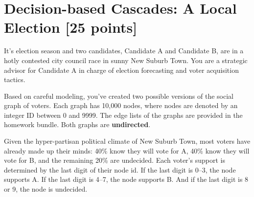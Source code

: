 
\section{Decision-based Cascades: A Local Election [25 points]}
It's election season and two candidates, Candidate A and Candidate B, are in a
hotly contested city council race in sunny New Suburb Town. You are a strategic
advisor for Candidate A in charge of election forecasting and voter acquisition
tactics.

Based on careful modeling, you've created two possible versions of the social
graph of voters. Each graph has 10,000 nodes, where nodes are denoted by an
integer ID between 0 and 9999.  The edge lists of the graphs are provided in 
the homework bundle.
Both graphs are \textbf{undirected}.

Given the hyper-partisan political climate of New Suburb Town, most voters have
already made up their minds: 40\% know they will vote for A, 40\% know they will
vote for B, and the remaining 20\% are undecided. Each voter's support is
determined by the last digit of their node id. If the last digit is 0--3, the
node supports A. If the last digit is 4--7, the node supports B. And if the last
digit is 8 or 9, the node is undecided.

